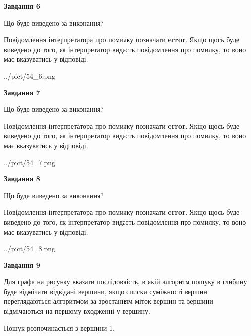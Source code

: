 \documentclass[12pt, ukrainian]{article}
\begin{document}
{\begin {large}
{\begin {center}\textbf{Завдання 6}\end {center}}\par
Що буде виведено за виконання?

Повідомлення інтерпретатора про помилку позначати \textbf{error}.
Якщо щось буде виведено до того, як інтерпретатор видасть повідомлення про помилку, 
то воно має вказуватись у відповіді. \par


\begin{center}
	{../pict/54_6.png}
\end{center}
\newpage

{\begin {center}\textbf{Завдання 7}\end {center}}\par
Що буде виведено за виконання?

Повідомлення інтерпретатора про помилку позначати \textbf{error}.
Якщо щось буде виведено до того, як інтерпретатор видасть повідомлення про помилку, 
то воно має вказуватись у відповіді. \par


\begin{center}
	{../pict/54_7.png}
\end{center}
\newpage

{\begin {center}\textbf{Завдання 8}\end {center}}\par
Що буде виведено за виконання?

Повідомлення інтерпретатора про помилку позначати \textbf{error}.
Якщо щось буде виведено до того, як інтерпретатор видасть повідомлення про помилку, 
то воно має вказуватись у відповіді. \par


\begin{center}
	{../pict/54_8.png}
\end{center}
\newpage

{\begin {center}\textbf{Завдання 9}\end {center}}\par
Для графа на рисунку вказати послідовність, в якій алгоритм пошуку в глибину буде відмічати відвідані вершини, якщо списки суміжності вершин переглядаються алгоритмом за зростанням міток вершин та вершини відмічаються на першому вход\-женні у вершину.\par
Пошук розпочинається з вершини 1.\par


\end{large}}
\end{document}
